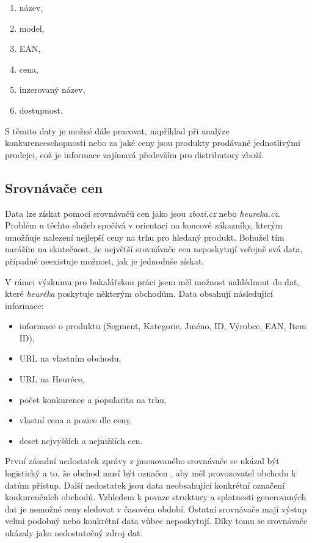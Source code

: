 \documentclass[thesis=B,czech]{FITthesis}[2012/06/26]
\begin{document}
\begin{enumerate}
\item název,
\item model,
\item EAN,
\item cena,
\item inzerovaný název,
\item dostupnost.
\end{enumerate}

S těmito daty je možné dále pracovat, například při analýze konkurenceschopnosti nebo za jaké ceny jsou produkty prodávané
jednotlivými prodejci, což je informace zajímavá především pro distributory zboží. \cite{hunka}

\subsection{Srovnávače cen}

Data lze získat pomocí srovnávačů cen jako jsou \textit{zbozi.cz}\cite{heureka} 
nebo \textit{heureka.cz}\cite{zbozi}. Problém u těchto služeb spočívá v orientaci na koncové zákazníky, kterým umožňuje
nalezení nejlepší ceny na trhu pro hledaný produkt. Bohužel tím narážím na skutečnost, že největší srovnávače cen neposkytují veřejně 
svá data, případně neexistuje možnost, jak je jednoduše získat. 
\par
V rámci výzkumu pro bakalářskou práci jsem měl možnost nahlédnout do dat, které \textit{heuréka} poskytuje některým obchodům. \cite{hunka}
Data obsahují následující informace:

\begin{itemize}
\item informace o produktu (Segment, Kategorie, Jméno, ID, Výrobce, EAN, Item ID),
\item URL na vlastním obchodu,
\item URL na Heuréce,
\item počet konkurence a popularita na trhu,
\item vlastní cena a pozice dle ceny,
\item deset nejvyšších a nejnižších cen.
\end{itemize}

První zásadní nedostatek zprávy z jmenovaného srovnávače se ukázal být logistický a to, že obchod musí být označen ,
aby měl provozovatel obchodu k datům přístup. Další nedostatek jsou data neobsahující konkrétní označení konkurenčních obchodů.\cite{heureka-report}
Vzhledem k povaze struktury a splatnosti generovaných dat je nemožné ceny sledovat v časovém období.
Ostatní srovnávače mají výstup velmi podobný nebo konkrétní data vůbec neposkytují. Díky tomu se srovnávače ukázaly jako nedostatečný zdroj dat.\cite{hunka}
\end{document}
